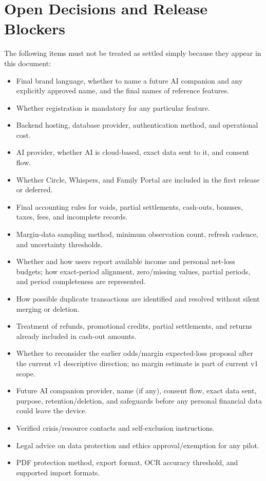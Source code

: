 \documentclass[11pt,a4paper]{article}
\begin{document}
\section{Open Decisions and Release Blockers}

The following items must not be treated as settled simply because they appear in this document:
\begin{itemize}
  \item Final brand language, whether to name a future AI companion and any explicitly approved name, and the final names of reference features.
  \item Whether registration is mandatory for any particular feature.
  \item Backend hosting, database provider, authentication method, and operational cost.
  \item AI provider, whether AI is cloud-based, exact data sent to it, and consent flow.
  \item Whether Circle, Whispers, and Family Portal are included in the first release or deferred.
  \item Final accounting rules for voids, partial settlements, cash-outs, bonuses, taxes, fees, and incomplete records.
  \item Margin-data sampling method, minimum observation count, refresh cadence, and uncertainty thresholds.
  \item Whether and how users report available income and personal net-loss budgets; how exact-period alignment, zero/missing values, partial periods, and period completeness are represented.
  \item How possible duplicate transactions are identified and resolved without silent merging or deletion.
  \item Treatment of refunds, promotional credits, partial settlements, and returns already included in cash-out amounts.
  \item Whether to reconsider the earlier odds/margin expected-loss proposal after the current v1 descriptive direction; no margin estimate is part of current v1 scope.
  \item Future AI companion provider, name (if any), consent flow, exact data sent, purpose, retention/deletion, and safeguards before any personal financial data could leave the device.
  \item Verified crisis/resource contacts and self-exclusion instructions.
  \item Legal advice on data protection and ethics approval/exemption for any pilot.
  \item PDF protection method, export format, OCR accuracy threshold, and supported import formats.
\end{itemize}
\end{document}
